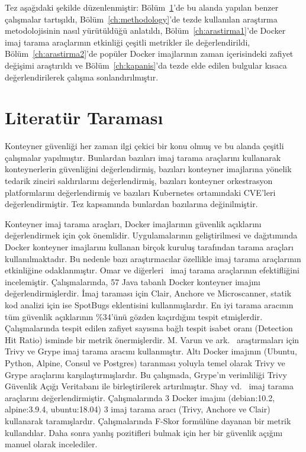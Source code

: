 
Tez aşağıdaki şekilde düzenlenmiştir: Bölüm~\ref{ch:literatur}'de bu alanda yapılan benzer çalışmalar tartışıldı, Bölüm~\ref{ch:methodology}'de tezde kullanılan araştırma metodolojisinin nasıl yürütüldüğü anlatıldı, Bölüm~\ref{ch:arastirma1}'de Docker imaj tarama araçlarının etkinliği çeşitli metrikler ile değerlendirildi, Bölüm~\ref{ch:arastirma2}'de popüler Docker imajlarının zaman içerisindeki zafiyet değişimi araştırıldı ve Bölüm~\ref{ch:kapanis}'da tezde elde edilen bulgular kısaca değerlendirilerek çalışma sonlandırılmıştır.

\chapter{Literatür Taraması}\label{ch:literatur}

Konteyner güvenliği her zaman ilgi çekici bir konu olmuş ve bu alanda çeşitli çalışmalar yapılmıştır. Bunlardan bazıları imaj tarama araçlarını kullanarak konteynerlerin güvenliğini değerlendirmiş, bazıları konteyner imajlarına yönelik tedarik zinciri saldırılarını değerlendirmiş, bazıları konteyner orkestrasyon platformlarını değerlendirmiş ve bazıları Kubernetes ortamındaki CVE'leri değerlendirmiştir. Tez kapsamında bunlardan bazılarına değinilmiştir.

Konteyner imaj tarama araçları, Docker imajlarının güvenlik açıklarını değerlendirmek için çok önemlidir. Uygulamalarının geliştirilmesi ve dağıtımında Docker konteyner imajlarını kullanan birçok kuruluş tarafından tarama araçları kullanılmaktadır. Bu nedenle bazı araştırmacılar özellikle imaj tarama araçlarının etkinliğine odaklanmıştır. Omar ve diğerleri~\autocite{Javed2021} imaj tarama araçlarının efektifliğini incelemiştir. Çalışmalarında, 57 Java tabanlı Docker konteyner imajını değerlendirmişlerdir. İmaj taraması için Clair, Anchore ve Microscanner, statik kod analizi için ise SpotBugs eklentisini kullanmışlardır. En iyi tarama aracının tüm güvenlik açıklarının \%34'ünü gözden kaçırdığını tespit etmişlerdir. Çalışmalarında tespit edilen zafiyet sayısına bağlı tespit isabet oranı (Detection Hit Ratio) isminde bir metrik önermişlerdir. M. Varun ve ark.~\autocite{Varun2023} araştırmaları için Trivy ve Grype imaj tarama aracını kullanmıştır. Altı Docker imajının (Ubuntu, Python, Alpine, Consul ve Postgres) taranması yoluyla temel olarak Trivy ve Grype araçlarını karşılaştırmışlardır. Bu çalışmada, Grype'ın verimliliği Trivy Güvenlik Açığı Veritabanı ile birleştirilerek artırılmıştır. Shay vd.~\autocite{UBCIS} imaj tarama araçlarını değerlendirmiştir. Çalışmalarında 3 Docker imajını (debian:10.2, alpine:3.9.4, ubuntu:18.04) 3 imaj tarama aracı (Trivy, Anchore ve Clair) kullanarak taramışlardır. Çalışmalarında F-Skor formülüne dayanan bir metrik kullandılar. Daha sonra yanlış pozitifleri bulmak için her bir güvenlik açığını manuel olarak incelediler.

